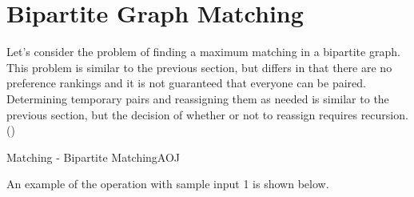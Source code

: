 \chapter{Bipartite Graph Matching}

Let's consider the problem of finding a maximum matching in a bipartite graph. This problem is similar to the previous section, but differs in that there are no preference rankings and it is not guaranteed that everyone can be paired. Determining temporary pairs and reassigning them as needed is similar to the previous section, but the decision of whether or not to reassign requires recursion. (\pccbook[pp.~195--])

\begin{psbox}{Matching - Bipartite Matching}{AOJ}
  
\end{psbox}

An example of the operation with sample input 1 is shown below.

